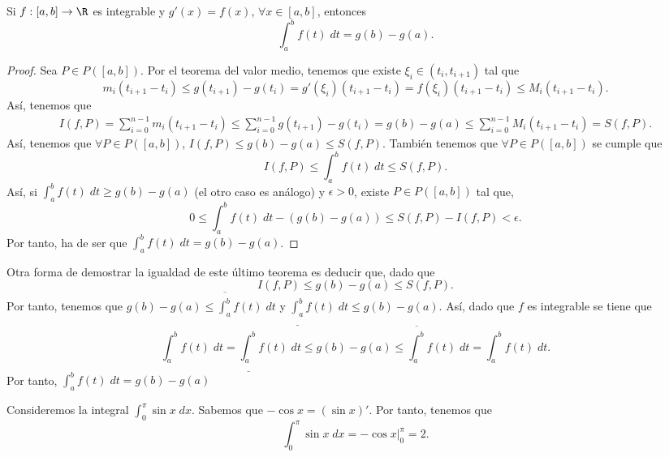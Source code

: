 \begin{ftheorem}
	\normalfont Si $\displaystyle f : \left[a,b\right] \to \R $ es integrable y $\displaystyle g'\left(x\right) = f\left(x\right) $, $\displaystyle \forall x \in \left[a,b\right]  $, entonces 
	\[ \int^{b}_{a} f\left(t\right) \; dt = g\left(b\right)-g\left(a\right) .\]
\end{ftheorem}
\begin{proof}
	Sea $\displaystyle P \in P\left(\left[a,b\right] \right) $. Por el teorema del valor medio, tenemos que existe $\displaystyle \xi_{i} \in \left(t_{i}, t_{i+1}\right) $ tal que 
	\[ m_{i}\left(t_{i+1}-t_{i}\right) \leq g\left(t_{i+1}\right)-g\left(t_{i}\right) = g'\left(\xi_{i}\right)\left(t_{i+1}-t_{i}\right) = f\left(\xi_{i}\right)\left(t_{i+1}-t_{i}\right) \leq M_{i}\left(t_{i+1}-t_{i}\right) .\]
	Así, tenemos que
	\[
	\begin{split}
	I\left(f,P\right) = \sum^{n-1}_{i = 0}m_{i}\left(t_{i+1}-t_{i}\right) \leq \sum^{n-1}_{i=0}g\left(t_{i+1}\right)-g\left(t_{i}\right) = g\left(b\right)-g\left(a\right) \leq \sum^{n-1}_{i=0}M_{i}\left(t_{i+1}-t_{i}\right) = S\left(f,P\right) .
	\end{split}
	\]
	Así, tenemos que $\displaystyle \forall P \in P\left([a,b]\right) $, $\displaystyle I\left(f,P\right) \leq g\left(b\right)-g\left(a\right)\leq S\left(f,P\right) $. También tenemos que $\displaystyle \forall P \in P\left(\left[a,b\right] \right) $ se cumple que
	\[ I\left(f,P\right) \leq \int^{b}_{a} f\left(t\right) \; dt \leq S\left(f,P\right) .\]
	Así, si $\displaystyle \int^{b}_{a} f\left(t\right) \; dt \geq g\left(b\right)-g\left(a\right) $ (el otro caso es análogo) y $\displaystyle \epsilon > 0 $, existe $\displaystyle P \in P\left(\left[a,b\right] \right) $ tal que,
	\[ 0 \leq \int^{b}_{a} f\left(t\right) \; dt - \left(g\left(b\right)-g\left(a\right)\right) \leq S\left(f,P\right)-I\left(f,P\right) < \epsilon .\]
Por tanto, ha de ser que $\displaystyle \int^{b}_{a} f\left(t\right) \; dt = g\left(b\right)-g\left(a\right) $.	
\end{proof}
\begin{observation}
\normalfont Otra forma de demostrar la igualdad de este último teorema es deducir que, dado que 
\[ I\left(f,P\right) \leq g\left(b\right)-g\left(a\right) \leq S\left(f,P\right) .\]
Por tanto, tenemos que $\displaystyle g\left(b\right)-g\left(a\right) \leq \overline{\int^{b}_{a}} f\left(t\right) \; dt $ y $\displaystyle \underline{\int^{b}_{a}} f\left(t\right) \; dt \leq g\left(b\right)-g\left(a\right) $. Así, dado que $\displaystyle f $ es integrable se tiene que
\[\int^{b}_{a} f\left(t\right) \; dt = \underline{\int^{b}_{a}} f\left(t\right) \; dt \leq g\left(b\right)-g\left(a\right) \leq \overline{\int^{b}_{a}} f\left(t\right) \; dt = \int^{b}_{a} f\left(t\right) \; dt .\]
Por tanto, $\displaystyle \int^{b}_{a} f\left(t\right) \; dt= g\left(b\right)-g\left(a\right) $ 
\end{observation}
\begin{eg}
\normalfont Consideremos la integral $\displaystyle \int^{\pi }_{0} \sin x \; dx $. Sabemos que $\displaystyle -\cos x = \left(\sin x\right)' $. Por tanto, tenemos que
\[\int^{\pi }_{0} \sin x \; dx = -\cos x |^{\pi }_{0} = 2.\]
\end{eg}
